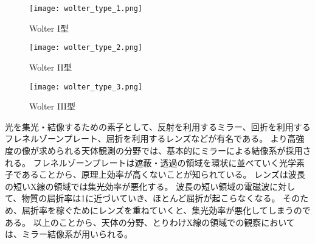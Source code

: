 \begin{figure}[b]
\centering
\texttt{[image: wolter\_type\_1.png]}
\caption{Wolter I型}
\label{fig:wolter_type_1}
\end{figure}

\begin{figure}[b]
\centering
\texttt{[image: wolter\_type\_2.png]}
\caption{Wolter II型}
\label{fig:wolter_type_2}
\end{figure}

\begin{figure}[b]
\centering
\texttt{[image: wolter\_type\_3.png]}
\caption{Wolter III型}
\label{fig:wolter_type_3}
\end{figure}

光を集光・結像するための素子として、反射を利用するミラー、回折を利用するフレネルゾーンプレート、屈折を利用するレンズなどが有名である。
より高強度の像が求められる天体観測の分野では、基本的にミラーによる結像系が採用される。
フレネルゾーンプレートは遮蔽・透過の領域を環状に並べていく光学素子であることから、原理上効率が高くないことが知られている。
レンズは波長の短いX線の領域では集光効率が悪化する。
波長の短い領域の電磁波に対して、物質の屈折率は1に近づいていき、ほとんど屈折が起こらなくなる。
そのため、屈折率を稼ぐためにレンズを重ねていくと、集光効率が悪化してしまうのである。
以上のことから、天体の分野、とりわけX線の領域での観察においては、ミラー結像系が用いられる。

